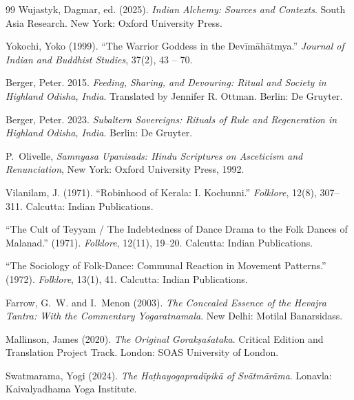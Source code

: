 \documentclass[11pt,twoside,letterpaper]{article}
\begin{document}
\begin{thebibliography}{99}
Wujastyk, Dagmar, ed. (2025). \textit{Indian Alchemy: Sources and Contexts}. South Asia Research. New York: Oxford University Press.

Yokochi, Yoko (1999). ``The Warrior Goddess in the Devīmāhātmya.'' \textit{Journal of Indian and Buddhist Studies}, 37(2), 43 -- 70.

Berger, Peter. 2015. \textit{Feeding, Sharing, and Devouring: Ritual and Society in Highland Odisha, India}. Translated by Jennifer R. Ottman. Berlin: De Gruyter.

Berger, Peter. 2023. \textit{Subaltern Sovereigns: Rituals of Rule and Regeneration in Highland Odisha, India}. Berlin: De Gruyter.

P.~Olivelle, \emph{Samnyasa Upanisads: Hindu Scriptures on Asceticism and 
Renunciation}, New York: Oxford University Press, 1992.

Vilanilam, J. (1971). ``Robinhood of Kerala: I. Kochunni.'' \textit{Folklore}, 12(8), 307--311. Calcutta: Indian Publications.

``The Cult of Teyyam / The Indebtedness of Dance Drama to the Folk Dances of Malanad.'' (1971). \textit{Folklore}, 12(11), 19--20. Calcutta: Indian Publications.

``The Sociology of Folk-Dance: Communal Reaction in Movement Patterns.'' (1972). \textit{Folklore}, 13(1), 41. Calcutta: Indian Publications.

Farrow, G.~W. and I.~Menon (2003). \textit{The Concealed Essence of the Hevajra Tantra: With the Commentary Yogaratnamala}. New Delhi: Motilal Banarsidass.

Mallinson, James (2020). \textit{The Original Gorakṣaśataka}. Critical Edition and Translation Project Track. London: SOAS University of London.

Swatmarama, Yogi (2024). \textit{The Haṭhayogapradīpikā of Svātmārāma}. Lonavla: Kaivalyadhama Yoga Institute.



\end{thebibliography}
\end{document}
